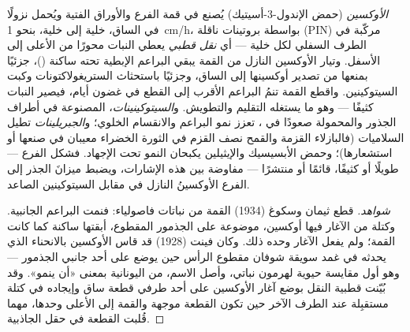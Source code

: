 \begin{proposition}\label{prop:b2:plant-meristems:apical}
\emph{الأوكسين} (حمض الإندول-3-أسيتيك) يُصنع في قمة الفرع
والأوراق الفتية ويُحمل نزولًا في الساق، خلية إلى خلية، بنحو
\qty{1}{cm/h}، بواسطة بروتينات ناقلة (PIN) مركّبة في الطرف السفلي
لكل خلية --- أي \emph{نقل قطبي} يعطي النبات
محورًا من الأعلى إلى الأسفل. وتيار الأوكسين النازل من القمة
يبقي البراعم الإبطية تحته ساكنة (\emph{})،
جزئيًا بمنعها من تصدير أوكسينها إلى
الساق، وجزئيًا باستحثاث الستريغولاكتونات وكبت السيتوكينين.
واقطع القمة تنمُ البراعم الأقرب إلى القطع في غضون أيام،
فيصير النبات كثيفًا --- وهو ما يستغله التقليم والتطويش.
و\emph{السيتوكينينات}، المصنوعة في أطراف الجذور والمحمولة صعودًا في ،
تعزز نمو البراعم والانقسام الخلوي؛ و\emph{الجبريلينات}
تطيل السلاميات (فالبازلاء القزمة والقمح نصف القزم في
الثورة الخضراء معيبان في صنعها أو استشعارها)؛ وحمض
الأبسيسيك والإيثيلين يكبحان النمو تحت الإجهاد. فشكل الفرع ---
طويلًا أو كثيفًا، قائمًا أو منتشرًا --- مفاوضة بين
هذه الإشارات، ويضبط ميزانَ الجذر إلى الفرع الأوكسينُ
النازل في مقابل السيتوكينين الصاعد.
\end{proposition}
\begin{proof}[شواهد]
قطع ثيمان وسكوغ (1934) القمة من نباتات فاصولياء: فنمت البراعم
الجانبية. وكتلة من الآغار فيها أوكسين، موضوعة على الجذمور
المقطوع، أبقتها ساكنة كما كانت القمة؛ ولم يفعل الآغار وحده ذلك. وكان
فينت (1928) قد قاس الأوكسين بالانحناء الذي يحدثه في
غمد سويقة شوفان مقطوع الرأس حين يوضع على أحد جانبي الجذمور ---
وهو أول مقايسة حيوية لهرمون نباتي، وأصل الاسم،
من اليونانية بمعنى «أن ينمو». وقد بُيّنت قطبية النقل
بوضع آغار الأوكسين على أحد طرفي قطعة ساق وإيجاده
في كتلة مستقبِلة عند الطرف الآخر حين تكون القطعة
موجهة والقمة إلى الأعلى وحدها، مهما قُلبت القطعة في حقل
الجاذبية.
\end{proof}

